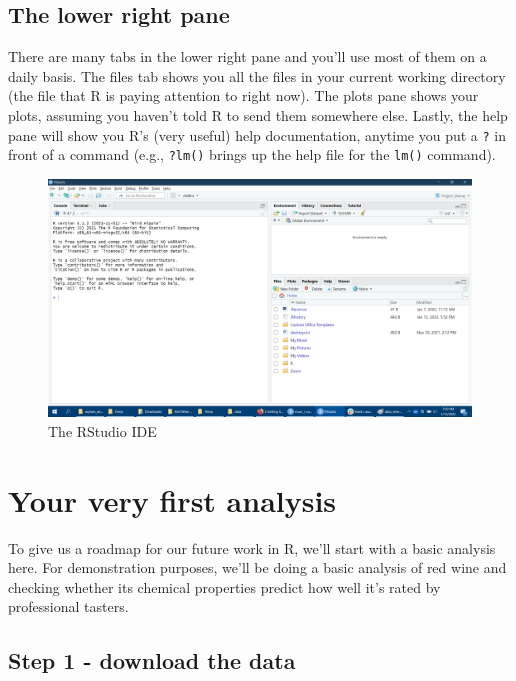 \documentclass[
]{book}
\begin{document}
\hypertarget{the-lower-right-pane}{%
\subsection{The lower right pane}\label{the-lower-right-pane}}

There are many tabs in the lower right pane and you'll use most of them on a daily basis. The files tab shows you all the files in your current working directory (the file that R is paying attention to right now). The plots pane shows your plots, assuming you haven't told R to send them somewhere else. Lastly, the help pane will show you R's (very useful) help documentation, anytime you put a \texttt{?} in front of a command (e.g., \texttt{?lm()} brings up the help file for the \texttt{lm()} command).

\begin{figure}

{\centering \includegraphics[width=0.8\linewidth]{images/rstudio} 

}

\caption{The RStudio IDE}\label{fig:unnamed-chunk-5}
\end{figure}

\hypertarget{your-very-first-analysis}{%
\section{Your very first analysis}\label{your-very-first-analysis}}

To give us a roadmap for our future work in R, we'll start with a basic analysis here. For demonstration purposes, we'll be doing a basic analysis of red wine and checking whether its chemical properties predict how well it's rated by professional tasters.

\hypertarget{step-1---download-the-data}{%
\subsection{Step 1 - download the data}\label{step-1---download-the-data}}
\end{document}

